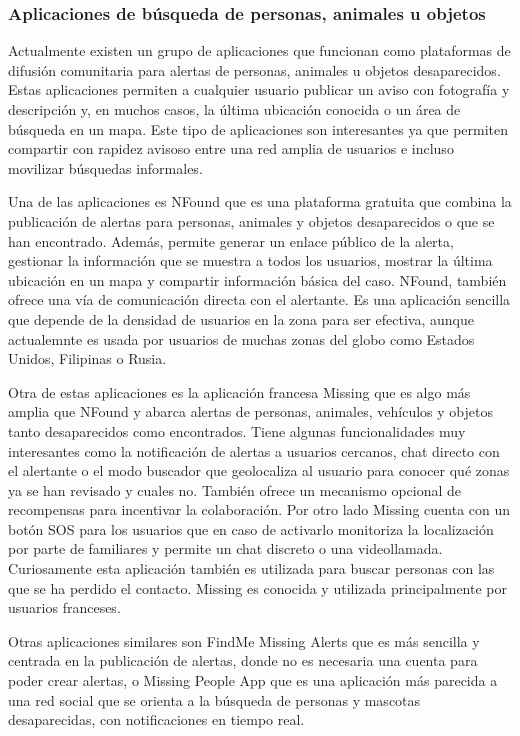     
    \subsubsection{Aplicaciones de búsqueda de personas, animales u objetos}
    
    Actualmente existen un grupo de aplicaciones que funcionan como plataformas de difusión comunitaria para alertas de personas, animales u objetos desaparecidos. Estas aplicaciones permiten a cualquier usuario publicar un aviso con fotografía y descripción y, en muchos casos, la última ubicación conocida o un área de búsqueda en un mapa. Este tipo de aplicaciones son interesantes ya que permiten compartir con rapidez avisoso entre una red amplia de usuarios e incluso movilizar búsquedas informales.
    
    Una de las aplicaciones es NFound que es una plataforma gratuita que combina la publicación de alertas para personas, animales y objetos desaparecidos o que se han encontrado. Además, permite generar un enlace público de la alerta, gestionar la información que se muestra a todos los usuarios, mostrar la última ubicación en un mapa y compartir información básica del caso. NFound, también ofrece una vía de comunicación directa con el alertante. Es una aplicación sencilla  que depende de la densidad de usuarios en la zona para ser efectiva, aunque actualemnte es usada por usuarios de muchas zonas del globo como Estados Unidos, Filipinas o Rusia. \cite{nfound_web, nfound_playstore}
    
    Otra de estas aplicaciones es la aplicación francesa Missing que es algo más amplia que NFound y abarca alertas de personas, animales, vehículos y objetos tanto desaparecidos como encontrados. Tiene algunas funcionalidades muy interesantes como la notificación de alertas a usuarios cercanos, chat directo con el alertante o el modo buscador que geolocaliza al usuario para conocer qué zonas ya se han revisado y cuales no. También ofrece un mecanismo opcional de recompensas para incentivar la colaboración. Por otro lado Missing cuenta con un botón SOS para los usuarios que en caso de activarlo monitoriza la localización por parte de familiares y permite un chat discreto o una videollamada. Curiosamente esta aplicación también es utilizada para buscar personas con las que se ha perdido el contacto. Missing es conocida y utilizada principalmente por usuarios franceses. \cite{missing_web, missing_playstore}
    
    Otras aplicaciones similares son FindMe Missing Alerts que es más sencilla y centrada en la publicación de alertas, donde no es necesaria una cuenta para poder crear alertas, o Missing People App que es una aplicación más parecida a una red social que se orienta a la búsqueda de personas y mascotas desaparecidas, con notificaciones en tiempo real. \cite{findme_applestore, missingpeoplesapp_web}
    
